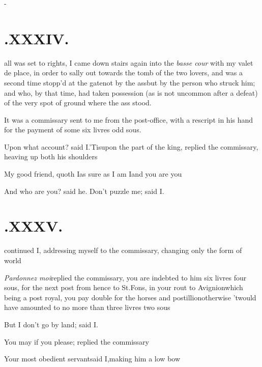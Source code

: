 \documentclass{article}
\begin{document}
\vfill{}\eject
\null\kern-\baselineskip
\section{.\enspace XXXIV.}

 all was set to rights, I\break
came down stairs again into the\break
\textit{basse cour} with my valet de place, in order to
sally out towards the tomb of the two lovers, \etc\tsk and was a
second time stopp’d at the gate\tsh not by the ass\tsk but by
the person who struck him; and who, by that time, had taken
possession (as is not uncommon after a defeat) of the very spot
of ground where the ass stood.

It was a commissary sent to me from the post-office, with a
rescript in his hand for the payment of some six livres odd
sous.

Upon what account? said I.\tsh ’Tis\break upon the part
of the king, replied the commissary, heaving up both his
shoulders\tsh

\tsh My good friend, quoth I\tsh as sure as I
am I\tsk and you are you\tsh

\tsh And who are you? said he.\tsh\break
\tsh Don’t puzzle me; said I.

\section{.\enspace XXXV.}

\noindent
{}
continued I, addressing myself to the commissary, changing only
the form of 
world\tsh

\textit{Pardonnez moi}\tsk replied the commissary, you are
indebted to him six livres
four sous, for the next post from hence to St.\@ Fons, in your
rout to Avignion\sic\tsk which being a post royal, you pay double
for the horses and postillion\tsk otherwise ’twould have
amounted to no more than three livres two sous\tsh

\tsh But I don’t go by land; said I.

\tsh You may if you please; replied the commissary\tsh

Your most obedient servant\tsh said I,\break making him a low bow\tsh
\end{document}

